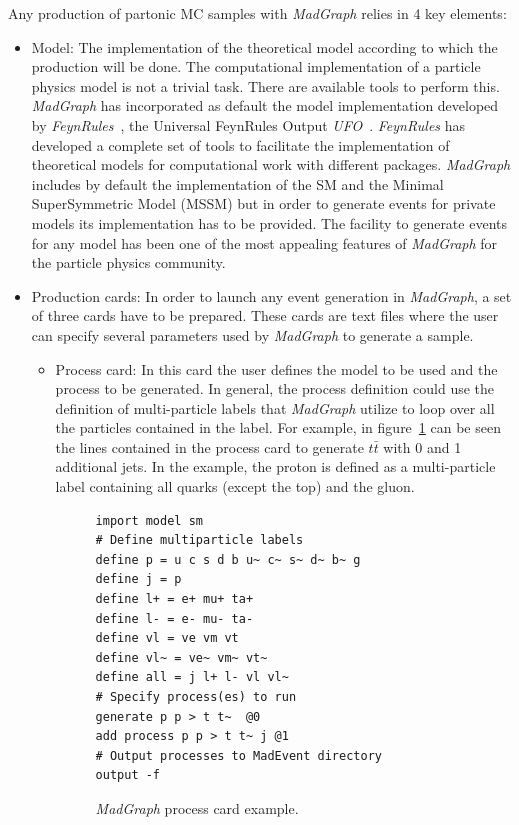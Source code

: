 Any production of partonic MC samples with \textit{MadGraph} relies in 4 key elements:
\begin{itemize}
\item Model: The implementation of the theoretical model according to which the production will be done. The computational implementation of a particle physics model is not a trivial task. There are available tools to perform this. \textit{MadGraph} has incorporated as default the model implementation developed by \textit{FeynRules}~\cite{Alloul:2013bka}, the Universal FeynRules Output \textit{UFO}~\cite{Degrande:2011ua}. \textit{FeynRules} has developed a complete set of tools to facilitate the implementation of theoretical models for computational work with different packages. \textit{MadGraph} includes by default the implementation of the SM and the Minimal SuperSymmetric Model (MSSM) but in order to generate events for private models its implementation has to be provided. The facility to generate events for any model has been one of the most appealing features of \textit{MadGraph} for the particle physics community.
\item Production cards: In order to launch any event generation in \textit{MadGraph}, a set of three cards have to be prepared. These cards are text files where the user can specify several parameters used by \textit{MadGraph} to generate a sample.
  \begin{itemize}
  \item Process card: In this card the user defines the model to be used and the process to be generated. In general, the process definition could use the definition of multi-particle labels that  \textit{MadGraph} utilize to loop over all the particles contained in the label. For example, in figure~\ref{fig:ProcCard} can be seen the lines contained in the process card to generate $t\bar{t}$ with 0 and 1 additional jets. In the example, the proton is defined as a multi-particle label containing all quarks (except the top) and the gluon. 
    \begin{figure}[!Hhtbp]
      \begin{center}
        \begin{minipage}[c]{0.45\textwidth}
\begin{verbatim}
import model sm
# Define multiparticle labels
define p = u c s d b u~ c~ s~ d~ b~ g
define j = p
define l+ = e+ mu+ ta+
define l- = e- mu- ta-
define vl = ve vm vt
define vl~ = ve~ vm~ vt~
define all = j l+ l- vl vl~
# Specify process(es) to run
generate p p > t t~  @0
add process p p > t t~ j @1
# Output processes to MadEvent directory
output -f
\end{verbatim}
        \end{minipage}
          \caption{\textit{MadGraph} process card example.}
          \label{fig:ProcCard}
      \end{center}
    \end{figure}
    

\end{itemize}
\end{itemize}
